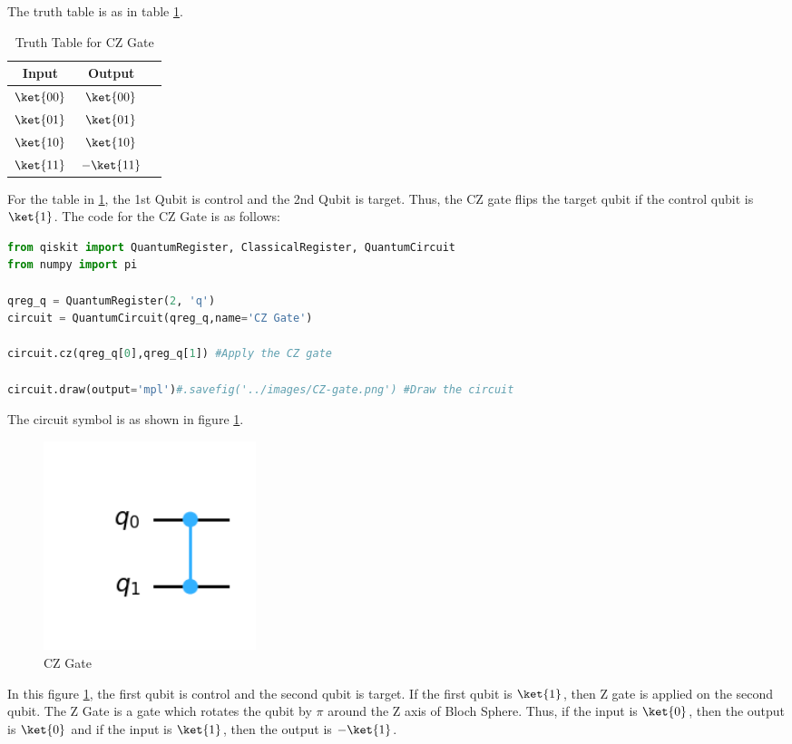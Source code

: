 \documentclass[12pt, oneside]{book}
\theoremstyle{definition}
\theoremstyle{definition}
\theoremstyle{remark}
\begin{document}
The truth table is as in table \ref{tab:cz}.
\begin{table}[H]
    \centering
    \begin{tabular}{|c|c|c|}
        \hline
        Input & Output\\
        \hline
        $\ket{00}$ & $\ket{00}$\\
        $\ket{01}$   & $\ket{01}$\\
        $\ket{10}$   & $\ket{10}$\\
        $\ket{11}$  & $-\ket{11}$\\
        \hline
    \end{tabular}
    \caption{Truth Table for CZ Gate}
    \label{tab:cz}
\end{table}
For the table in \ref{tab:cz}, the 1st Qubit is control and the 2nd Qubit is target.
Thus, the CZ gate flips the target qubit if the control qubit is $\ket{1}$.
The code for the CZ Gate is as follows:
\begin{lstlisting}[language=Python]
from qiskit import QuantumRegister, ClassicalRegister, QuantumCircuit
from numpy import pi

qreg_q = QuantumRegister(2, 'q')
circuit = QuantumCircuit(qreg_q,name='CZ Gate')

circuit.cz(qreg_q[0],qreg_q[1]) #Apply the CZ gate

circuit.draw(output='mpl')#.savefig('../images/CZ-gate.png') #Draw the circuit
\end{lstlisting}

The circuit symbol is as shown in figure \ref{fig:cz}.
\begin{figure}[H]
    \centering
    \includegraphics[width=0.3\textwidth]{../images/CZ-gate.png}
    \caption{CZ Gate}
    \label{fig:cz}
\end{figure}
In this figure \ref{fig:cz}, the first qubit is control and the second qubit is target.
If the first qubit is $\ket{1}$, then Z gate is applied on the second qubit. The Z Gate
is a gate which rotates the qubit by $\pi$ around the Z axis of Bloch Sphere. Thus, if 
the input is $\ket{0}$, then the output is $\ket{0}$ and if the input is $\ket{1}$, then the output is $-\ket{1}$.
\end{document}
